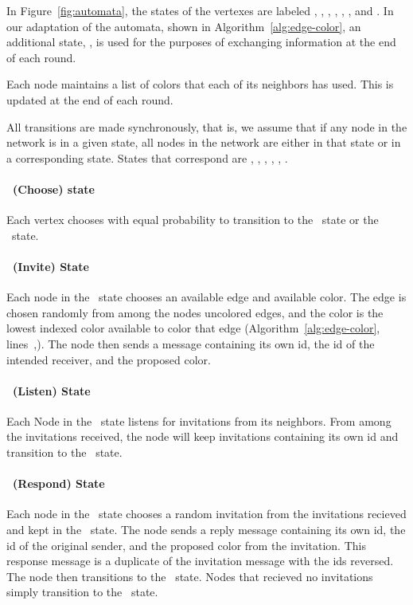 In Figure~\ref{fig:automata}, the states of the vertexes are labeled \cCd, \cId, \cLd, \cWd, \cRd, \cUd, and \cDd. In our adaptation of the automata, shown in Algorithm~\ref{alg:edge-color}, an additional state, \cEd, is used for the purposes of exchanging information at the end of each round.

Each node maintains a list of colors that each of its neighbors has used. This is updated at the end of each round.

All transitions are made synchronously, that is, we assume that if any node in the network is in a given state, all nodes in the network are either in that state or in a corresponding state. States that correspond are {\cCd, \cDd}, {\cId, \cLd}, {\cRd, \cWd}.

\paragraph{\cCd\ (Choose) state}
Each vertex chooses with equal probability to transition to the \cId\ state or the \cLd\ state. 

\paragraph{\cId\ (Invite) State} 
Each node in the \cId\ state chooses an available edge and available color. The edge is chosen randomly from among the nodes uncolored edges, and the color is the lowest indexed color available to color that edge (Algorithm~\ref{alg:edge-color}, lines~,). The node then sends a message containing its own id, the id of the intended receiver, and the proposed color. 

\paragraph{\cLd\ (Listen) State} 
Each Node in the \cLd\ state listens for invitations from its neighbors. From among the invitations received, the node will keep invitations containing its own id and transition to the \cRd\ state.

\paragraph{\cRd\ (Respond) State}
Each node in the \cRd\ state chooses a random invitation from the invitations recieved and kept in the \cLd\ state. The node sends a reply message containing its own id, the id of the original sender, and the proposed color from the invitation. This response message is a duplicate of the invitation message with the ids reversed. The node then transitions to the \cUd\ state. Nodes that recieved no invitations simply transition to the \cUd\ state.


